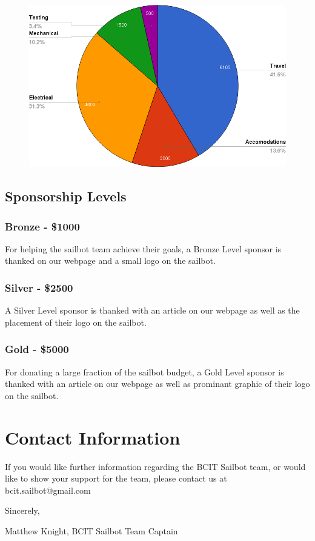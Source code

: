 \documentclass{article}
\begin{document}
\begin{figure}[H]
    \centering
    \includegraphics[scale=0.5]{budget.png}
\end{figure}

\newpage

\subsection*{Sponsorship Levels}

\subsubsection*{Bronze - \$1000}

For helping the sailbot team achieve their goals, a Bronze Level sponsor is
thanked on our webpage and a small logo on the sailbot.

\subsubsection*{Silver - \$2500}

A Silver Level sponsor is thanked with an article on our webpage as well as
the placement of their logo on the sailbot.

\subsubsection*{Gold - \$5000}

For donating a large fraction of the sailbot budget, a Gold Level sponsor is
thanked with an article on our webpage as well as prominant graphic of their
logo on the sailbot.

\section*{Contact Information}
If you would like further information regarding the BCIT Sailbot team, or
would like to show your support for the team, please contact us at
bcit.sailbot@gmail.com


Sincerely,

Matthew Knight,
BCIT Sailbot Team Captain
\end{document}
